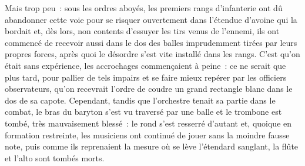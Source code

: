 {Mais trop peu~: sous les ordres aboyés, les premiers rangs
d'infanterie ont dû abandonner cette voie pour se risquer ouvertement
dans l'étendue d'avoine qui la bordait et, dès lors, non contents
d'essuyer les tirs venus de l'ennemi, ils ont commencé de recevoir
aussi dans le dos des balles imprudemment tirées par leurs propres
forces, après quoi le désordre s'est vite installé dans les rangs.
C'est qu'on était sans expérience, les accrochages commençaient à
peine~: ce ne serait que plus tard, pour pallier de tels impairs et
se faire mieux repérer par les officiers observateurs, qu'on
recevrait l'ordre de coudre un grand rectangle blanc dans le dos de
sa capote. Cependant, tandis que l'orchestre tenait sa partie dans le
combat, le bras du baryton s'est vu traversé par une balle et le
trombone est tombé, très mauvaisement blessé~: le rond s'est resserré
d'autant et, quoique en formation restreinte, les musiciens ont
continué de jouer sans la moindre fausse note, puis comme ils
reprenaient la mesure où se lève l'étendard sanglant, la flûte et
l'alto sont tombés morts.
}


